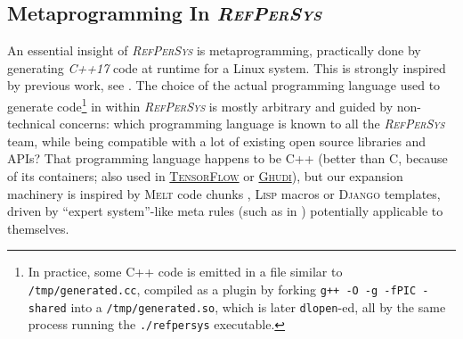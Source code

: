 \documentclass{IEEEtran}
\newcommand{\RefPerSys}{{\textit{\textsc{RefPerSys}}}}
\begin{document}
\subsection{Metaprogramming In \RefPerSys}
\label{subsec:metaprogramming}

An essential insight of {\RefPerSys} is metaprogramming, practically
done by generating \emph{C++17} code at runtime for a Linux
system. This is strongly inspired by previous work, see
\cite{Pitrat:1996:FGCS, Pitrat:2009:ArtifBeings,
  Starynkevitch:2019:bismon-draft, Starynkevitch-DSL2011,
  Starynkevitch:2007:Multistage}. The choice of the actual programming
language used to generate code\footnote{In practice, some C++ code is
emitted in a file similar to \texttt{/tmp/generated.cc}, compiled as a
plugin by forking \texttt{g++ -O -g -fPIC -shared} into a
\texttt{/tmp/generated.so}, which is later \texttt{dlopen}-ed, all by
the same process running the \texttt{./refpersys} executable.} in
within {\RefPerSys} is mostly arbitrary and guided by non-technical
concerns: which programming language is known to all the {\RefPerSys}
team, while being compatible with a lot of existing open source
libraries and APIs? That programming language happens to be C++
(better than C, because of its containers; also used in
\href{http://tensorflow.org}{\textsc{TensorFlow}} or
\href{https://gudhi.inria.fr/}{\textsc{Ghudi}}), but our expansion
machinery is inspired by \textsc{Melt} code chunks
\cite{Starynkevitch-DSL2011}, \textsc{Lisp} macros
\cite{Queinnec:1996:LSP} or \textsc{Django} templates, driven by
``expert system''-like meta rules (such as in \cite{Pitrat:1996:FGCS})
potentially applicable to themselves.




%
%
\end{document}
